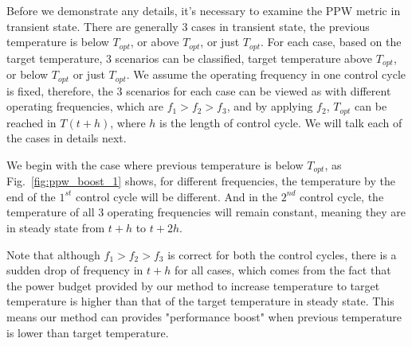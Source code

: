 Before we demonstrate any details, it's necessary to examine the PPW metric in transient state.
There are generally $3$ cases in transient state, the previous temperature is below $T_{opt}$, or above $T_{opt}$, or just $T_{opt}$. For each case, based on the target temperature, $3$ scenarios can be classified, target temperature above $T_{opt}$, or below $T_{opt}$ or just $T_{opt}$. We assume the operating frequency in one control cycle is fixed, therefore, the $3$ scenarios for each case can be viewed as with different operating frequencies, which are $f_{1}>f_{2}>f_{3}$, and by applying $f_{2}$, $T_{opt}$ can be reached in $T(t+h)$, where $h$ is the length of control cycle. We will talk each of the cases in details next.

We begin with the case where previous temperature is below $T_{opt}$, as Fig.~\ref{fig:ppw_boost_1} shows, for different frequencies, the temperature by the end of the $1^{st}$ control cycle will be different. And in the $2^{nd}$ control cycle, the temperature of all $3$ operating frequencies will remain constant, meaning they are in steady state from $t+h$ to $t+2h$.

Note that although $f_{1}>f_{2}>f_{3}$ is correct for both the control cycles, there is a sudden drop of frequency in $t+h$ for all cases, which comes from the fact that the power budget provided by our method to increase temperature to target temperature is higher than that of the target temperature in steady state. This means our method can provides "performance boost" when previous temperature is lower than target temperature.

